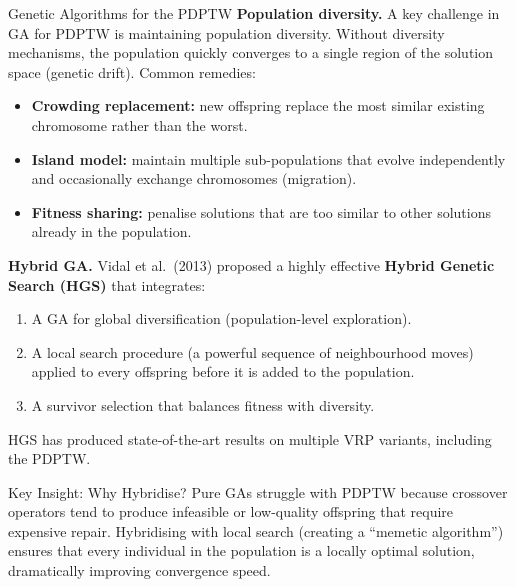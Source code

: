 \documentclass[aspectratio=169,10pt]{beamer}
\begin{document}
\begin{frame}[allowframebreaks]{Genetic Algorithms for the PDPTW}
  \textbf{Population diversity.} A key challenge in GA for PDPTW is maintaining population
  diversity. Without diversity mechanisms, the population quickly converges to a single
  region of the solution space (genetic drift). Common remedies:
  \begin{itemize}
    \item \textbf{Crowding replacement:} new offspring replace the most similar existing
          chromosome rather than the worst.
    \item \textbf{Island model:} maintain multiple sub-populations that evolve independently
          and occasionally exchange chromosomes (migration).
    \item \textbf{Fitness sharing:} penalise solutions that are too similar to other
          solutions already in the population.
  \end{itemize}

  \textbf{Hybrid GA.} Vidal et al.~(2013) proposed a highly effective \textbf{Hybrid
  Genetic Search (HGS)} that integrates:
  \begin{enumerate}
    \item A GA for global diversification (population-level exploration).
    \item A local search procedure (a powerful sequence of neighbourhood moves) applied
          to every offspring before it is added to the population.
    \item A survivor selection that balances fitness with diversity.
  \end{enumerate}
  HGS has produced state-of-the-art results on multiple VRP variants, including the PDPTW.

  \begin{alertblock}{Key Insight: Why Hybridise?}
    Pure GAs struggle with PDPTW because crossover operators tend to produce infeasible
    or low-quality offspring that require expensive repair. Hybridising with local search
    (creating a ``memetic algorithm'') ensures that every individual in the population
    is a locally optimal solution, dramatically improving convergence speed.
  \end{alertblock}

\end{frame}
\end{document}
